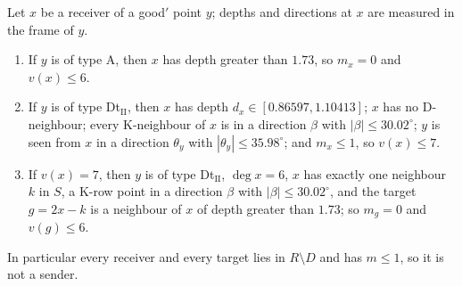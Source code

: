 \begin{lemma}[receivers]\label{lem:IIrecv}
Let $x$ be a receiver of a good$'$ point $y$; depths and directions at $x$ are measured in the frame of $y$.
\begin{enumerate}[label=\textup{(\alph*)}]
\item If $y$ is of type A, then $x$ has depth greater than $1.73$, so $m_x=0$ and $v(x)\le6$.
\item If $y$ is of type Dt$_{\mathrm{II}}$, then $x$ has depth $d_x\in[0.86597,1.10413]$; $x$ has no D-neighbour; every K-neighbour of $x$ is in a direction $\beta$ with $|\beta|\le30.02^\circ$; $y$ is seen from $x$ in a direction $\theta_y$ with $|\theta_y|\le35.98^\circ$; and $m_x\le1$, so $v(x)\le7$.
\item If $v(x)=7$, then $y$ is of type Dt$_{\mathrm{II}}$, $\deg x=6$, $x$ has exactly one neighbour $k$ in $S$, a K-row point in a direction $\beta$ with $|\beta|\le30.02^\circ$, and the target $g=2x-k$ is a neighbour of $x$ of depth greater than $1.73$; so $m_g=0$ and $v(g)\le6$.
\end{enumerate}
In particular every receiver and every target lies in $R\setminus D$ and has $m\le1$, so it is not a sender.
\end{lemma}
